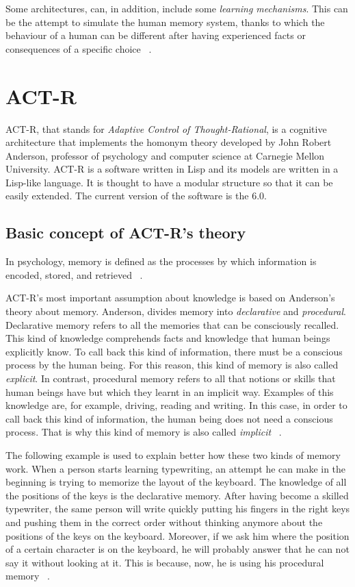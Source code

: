 	Some architectures, can, in addition, include some \emph{learning mechanisms}. This can be the attempt to simulate the human memory system, thanks to which the behaviour of a human can be different after having experienced facts or consequences of a specific choice ~\cite{Sears2012}.
	
	
  \section{ACT-R}
	\mbox{ACT-R}, that stands for \emph{Adaptive Control of Thought-Rational}, is a cognitive architecture that implements the homonym theory developed by John Robert Anderson, professor of psychology and computer science at Carnegie Mellon University. 
	\mbox{ACT-R} is a software written in Lisp and its models are written in a Lisp-like language. It is thought to have a modular structure so that it can be easily extended. The current version of the software is the 6.0. 
		
	\subsection*{Basic concept of ACT-R's theory}
	In psychology, memory is defined as the processes by which information is encoded, stored, and retrieved ~\cite{baddeley2009memory}. 
	
	\mbox{ACT-R's} most important assumption about knowledge is based on Anderson's theory about memory. 
	Anderson, divides memory into \emph{declarative} and \emph{procedural}. 
	Declarative memory refers to all the memories that can be consciously recalled. This kind of knowledge comprehends facts and knowledge that human beings explicitly know. To call back this kind of information, there must be a conscious process by the human being. For this reason, this kind of memory is also called \emph{explicit}.
	In contrast, procedural memory refers to all that notions or skills that human beings have but which they learnt in an implicit way. Examples of this knowledge are, for example, driving, reading and writing. In this case, in order to call back this kind of information, the human being does not need a conscious process. That is why this kind of memory is also called \emph{implicit} ~\cite{anderson1976language}. 
	
	The following example is used to explain better how these two kinds of memory work. 
	When a person starts learning typewriting, an attempt he can make in the beginning is trying to memorize the layout of the keyboard. The knowledge of all the positions of the keys is the declarative memory. After having become a skilled typewriter, the same person will write quickly putting his fingers in the right keys and pushing them in the correct order without thinking anymore about the positions of the keys on the keyboard. Moreover, if we ask him where the position of a certain character is on the keyboard, he will probably answer that he can not say it without looking at it. This is because, now, he is using his procedural memory ~\cite{anderson1993rules}.
	
